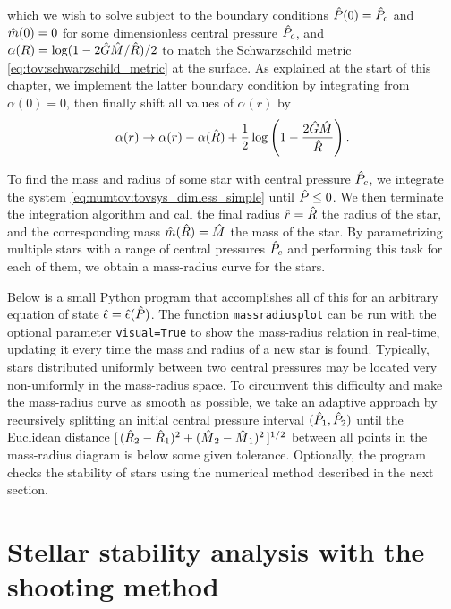 which we wish to solve subject to the boundary conditions $\hat{P}(0) = \hat{P}_c$ and $\hat{m}(0) = 0$ for some dimensionless central pressure $\hat{P}_c$, and $\alpha(R) = \log ( 1 - 2 \hat{G} \hat{M} / \hat{R} ) / 2$ to match the Schwarzschild metric \eqref{eq:tov:schwarzschild_metric} at the surface.
As explained at the start of this chapter, we implement the latter boundary condition by integrating from $\alpha(0) = 0$, then finally shift all values of $\alpha(r)$ by
\begin{equation}
	\alpha(r) \rightarrow \alpha(r) - \alpha(\hat{R}) + \frac12 \log \left( 1 - \frac{2 \hat{G} \hat{M} }{ \hat{R}} \right) .
\end{equation}

To find the mass and radius of some star with central pressure $\hat{P}_c$, we integrate the system \eqref{eq:numtov:tovsys_dimless_simple} until $\hat{P} \le 0$.
We then terminate the integration algorithm and call the final radius $\hat{r} = \hat{R}$ the radius of the star, and the corresponding mass $\hat{m}(\hat{R}) = \hat{M}$ the mass of the star.
By parametrizing multiple stars with a range of central pressures $\hat{P}_c$ and performing this task for each of them, we obtain a mass-radius curve for the stars.

Below is a small Python program that accomplishes all of this for an arbitrary equation of state $\hat{\epsilon} = \hat{\epsilon}(\hat{P})$.
The function \verb|massradiusplot| can be run with the optional parameter \verb|visual=True| to show the mass-radius relation in real-time, updating it every time the mass and radius of a new star is found.
Typically, stars distributed uniformly between two central pressures may be located very non-uniformly in the mass-radius space.
To circumvent this difficulty and make the mass-radius curve as smooth as possible, we take an adaptive approach by recursively splitting an initial central pressure interval $(\hat{P}_1, \hat{P}_2)$ until the Euclidean distance $[ \, (\smash[b]{\hat{R}}_2-\smash[b]{\hat{R}}_1)^2 + (\smash[b]{\hat{M}}_2-\smash[b]{\hat{M}}_1)^2 \, ]^{1/2}$ between all points in the mass-radius diagram is below some given tolerance.
Optionally, the program checks the stability of stars using the numerical method described in the next section.


\section{Stellar stability analysis with the shooting method}
\label{sec:numerics:shooting_method}

